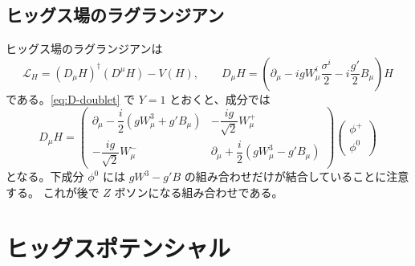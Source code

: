 \documentclass[uplatex,dvipdfmx,a4paper,11pt,openany]{jsbook}
\numberwithin{equation}{chapter}
\theoremstyle{definition}
\theoremstyle{plain}
\theoremstyle{remark}
\newcommand{\Lag}{\mathcal{L}}
\begin{document}
\subsection{ヒッグス場のラグランジアン}
ヒッグス場のラグランジアンは
\begin{equation}
\Lag_H=(D_\mu H)^\dagger(D^\mu H)-V(H),
\qquad
D_\mu H=\left(\partial_\mu-igW^i_\mu\frac{\sigma^i}{2}-i\frac{g'}{2}B_\mu\right)H
\label{eq:L-Higgs}
\end{equation}
である。\eqref{eq:D-doublet} で $Y=1$ とおくと、成分では
\begin{equation}
D_\mu H=
\begin{pmatrix}
\partial_\mu-\dfrac{i}{2}\left(gW_\mu^3+g'B_\mu\right) & -\dfrac{ig}{\sqrt2}W_\mu^+\\[2mm]
-\dfrac{ig}{\sqrt2}W_\mu^- & \partial_\mu+\dfrac{i}{2}\left(gW_\mu^3-g'B_\mu\right)
\end{pmatrix}
\begin{pmatrix}\phi^+\\ \phi^0\end{pmatrix}
\label{eq:DH-components}
\end{equation}
となる。下成分 $\phi^0$ には $gW^3-g'B$ の組み合わせだけが結合していることに注意する。
これが後で $Z$ ボソンになる組み合わせである。
\section{ヒッグスポテンシャル}
\label{sec:higgs-potential}
\end{document}
